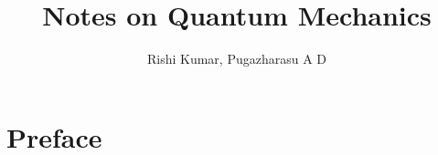 \documentclass[a4paper,12pt]{book}
\begin{document}
\author{Rishi Kumar, Pugazharasu A D}
\title{Notes on Quantum Mechanics}


\frontmatter
\maketitle
\tableofcontents
\chapter{Preface}

\mainmatter
%
%
%
%
%








%
%
\backmatter
\end{document}
